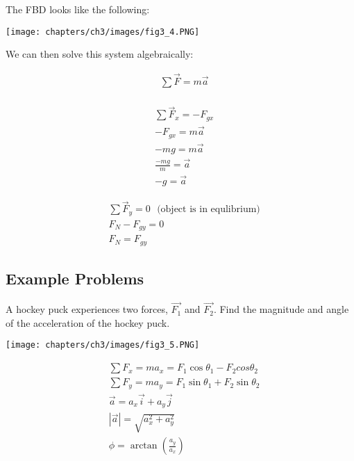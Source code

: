 The FBD looks like the following:

\begin{center}
	\texttt{[image: chapters/ch3/images/fig3\_4.PNG]}
\end{center}

We can then solve this system algebraically:

$$
	\begin{aligned}
		&\sum \vec F = m\vec{a}\\
	\end{aligned}
$$

$$
	\begin{aligned}
		&\sum \vec F_x = -F_{gx}\\
		&-F_{gx} = m\vec{a}\\
		&-mg = m\vec{a}\\
		&\frac{-mg}{m} = \vec{a}\\
		&{-g} = \vec{a}
	\end{aligned}
$$

$$
	\begin{aligned}
		&\sum \vec F_y = 0 \:\:\: \text{(object is in equlibrium)}\\
		&F_{N} - F_{gy} = 0\\
		&F_N = F_{gy}
	\end{aligned}
$$
\newpage

\subsection*{Example Problems}

\begin{problem}
	A hockey puck experiences two forces, $\vec{F_1}$ and $\vec{F_2}$. Find the magnitude and angle of the acceleration of the hockey puck.

	\begin{center}
		\texttt{[image: chapters/ch3/images/fig3\_5.PNG]}
	\end{center}

	$$
		\begin{aligned}
			&\sum F_x = ma_x = F_1\cos\theta_1 - F_2cos\theta_2\\
			&\sum F_y = ma_y = F_1\sin\theta_1 + F_2\sin\theta_2\\
			&\vec a = a_x \vec i + a_y \vec j\\
			&|\vec a| = \sqrt{a_x^2 + a_y^2}\\
			&\phi = \arctan\left(\frac{a_y}{a_x}\right)
		\end{aligned}
	$$
\end{problem}



